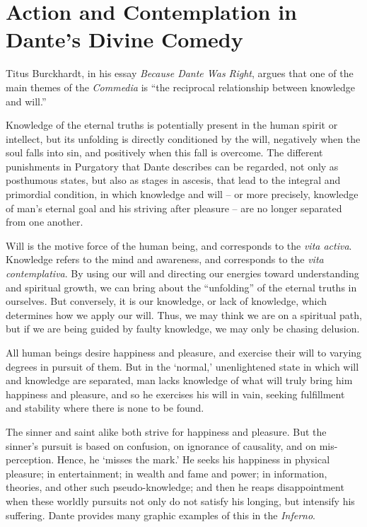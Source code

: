 \section{Action and Contemplation in Dante’s Divine Comedy}

Titus Burckhardt, in his essay \textit{Because Dante Was Right}, argues that one of the main themes of the \emph{Commedia} is ``the reciprocal relationship between knowledge and will.''

\begin{quotex}
Knowledge of the eternal truths is potentially present in the human spirit or intellect, but its unfolding is directly conditioned by the will, negatively when the soul falls into sin, and positively when this fall is overcome. The different punishments in Purgatory that Dante describes can be regarded, not only as posthumous states, but also as stages in ascesis, that lead to the integral and primordial condition, in which knowledge and will -- or more precisely, knowledge of man's eternal goal and his striving after pleasure -- are no longer separated from one another.
\end{quotex}


Will is the motive force of the human being, and corresponds to the \emph{vita activa}. Knowledge refers to the mind and awareness, and corresponds to the \emph{vita contemplativa}. By using our will and directing our energies toward understanding and spiritual growth, we can bring about the ``unfolding'' of the eternal truths in ourselves. But conversely, it is our knowledge, or lack of knowledge, which determines how we apply our will. Thus, we may think we are on a spiritual path, but if we are being guided by faulty knowledge, we may only be chasing delusion.

All human beings desire happiness and pleasure, and exercise their will to varying degrees in pursuit of them. But in the `normal,' unenlightened state in which will and knowledge are separated, man lacks knowledge of what will truly bring him happiness and pleasure, and so he exercises his will in vain, seeking fulfillment and stability where there is none to be found.

The sinner and saint alike both strive for happiness and pleasure. But the sinner's pursuit is based on confusion, on ignorance of causality, and on mis-perception. Hence, he `misses the mark.' He seeks his happiness in physical pleasure; in entertainment; in wealth and fame and power; in information, theories, and other such pseudo-knowledge; and then he reaps disappointment when these worldly pursuits not only do not satisfy his longing, but intensify his suffering. Dante provides many graphic examples of this in the \emph{Inferno}.

